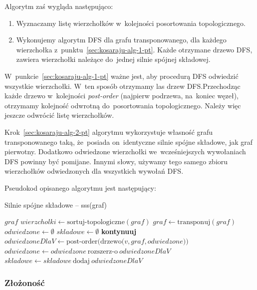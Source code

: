 \documentclass[a4paper,12pt]{mwart}
\newcommand{\algorithmiccontinue}{\textbf{kontynuuj}}
\newcommand{\Continue}{\State \algorithmiccontinue}
\begin{document}
Algorytm zaś wygląda następująco:

\begin{enumerate}
\item\label{sec:kosaraju-alg-1-pt} Wyznaczamy listę wierzchołków w~kolejności
  posortowania topologicznego.
\item\label{sec:kosaraju-alg-2-pt} Wykonujemy algorytm DFS dla grafu
  transponowanego, dla każdego wierzchołka
  z~punktu~\ref{sec:kosaraju-alg-1-pt}. Każde otrzymane drzewo DFS, zawiera
  wierzchołki należące do~jednej silnie spójnej składowej.
\end{enumerate}

W~punkcie~\ref{sec:kosaraju-alg-1-pt} ważne jest, aby procedurą DFS odwiedzić
wszystkie wierzchołki. W~ten sposób otrzymamy las drzew DFS.\@ Przechodząc
każde drzewo w~kolejności \emph{post-order} (najpierw podrzewa, na~koniec
węzeł), otrzymamy kolejność odwrotną do~posortowania topologicznego. Należy
więc jeszcze odwrócić listę wierzchołków.

Krok~\ref{sec:kosaraju-alg-2-pt} algorytmu wykorzystuje własność grafu
transponowanego taką, że~posiada on~identyczne silnie spójne składowe, jak graf
pierwotny. Dodatkowo odwiedzone wierzchołki we~wcześniejszych wywołaniach DFS
powinny być pomijane. Innymi słowy, używamy tego samego zbioru wierzchołków
odwiedzonych dla wszystkich wywołań DFS.

Pseudokod opisanego algorytmu jest następujący:

\begin{algorithm}[H]
\caption{Silnie spójne składowe -- sss(graf)}
\begin{algorithmic}[1]
\Require $graf$
\State $wierzcholki \gets \text{sortuj-topologiczne}(graf)$
\State $graf \gets \text{transponuj}(graf)$
\State $odwiedzone \gets \emptyset$ 
\State $skladowe \gets \emptyset$ 
\Continue
\EndIf
\State $odwiedzoneDlaV \gets \text{post-order(drzewo(} v, graf, odwiedzone))$
\State $odwiedzone \gets odwiedzone \ \text{rozszerz-o} \ odwiedzoneDlaV$
\State $skladowe \gets skladowe \ \text{dodaj} \ odwiedzoneDlaV$ 
\EndFor
\State {}
\end{algorithmic}
\end{algorithm}

\subsubsection{Złożoność}
\end{document}
